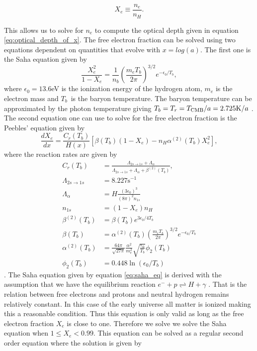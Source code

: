 \documentclass[onecolumn]{aastex62}
\begin{document}
\begin{equation}\label{eq:Xe}
    X_e\equiv\frac{n_e}{n_H}.
\end{equation}
 
This allows us to solve for $n_e$ to compute the optical depth given in equation \ref{eq:optical_depth_of_x}. The free electron fraction can be solved using two equations dependent on quantities that evolve with $x=log(a)$. The first one is the Saha equation given by
\begin{equation}\label{eq:saha_eq}
    \frac{X_e^2}{1-X_e} = \frac{1}{n_b} \left(\frac{m_eT_b}{2\pi}\right)^{3/2} e^{-\epsilon_0/T_b},
\end{equation}
where $\epsilon_0=13.6$eV is the ionization energy of the hydrogen atom, $m_e$ is the electron mass and $T_b$ is the baryon temperature. The baryon temperature can be approximated by the photon temperature giving $T_b =
T_r = T_{\rm CMB} / a = 2.725 \textrm{K} / a$ \cite{WintherII:2020}. The second equation one can use to solve for the free electron fraction is the Peebles' equation given by
\begin{equation}\label{eq:peeble_eq}
    \frac{dX_e}{dx} = \frac{C_r(T_b)}{H(x)} \left[\beta(T_b)(1-X_e) - n_H\alpha^{(2)}(T_b)X_e^2\right],
\end{equation}
where the reaction rates are given by
\begin{align}
    C_r(T_b) &= \frac{\Lambda_{2s\rightarrow1s} +
    \Lambda_{\alpha}}{\Lambda_{2s\rightarrow1s} + \Lambda_{\alpha} +
    \beta^{(2)}(T_b)}, \\
    \Lambda_{2s\rightarrow1s} &= 8.227 \textrm{s}^{-1}\\
    \Lambda_{\alpha} &= H\frac{(3\epsilon_0)^3}{(8\pi)^2 n_{1s}}\\
    n_{1s} &= (1-X_e)n_H \\
    \beta^{(2)}(T_b) &= \beta(T_b) e^{3\epsilon_0/4T_b} \\
    \beta(T_b) &= \alpha^{(2)}(T_b) \left(\frac{m_e
    T_b}{2\pi}\right)^{3/2} e^{-\epsilon_0/T_b} \\
    \alpha^{(2)}(T_b) &= \frac{64\pi}{\sqrt{27\pi}}
    \frac{\alpha^2}{m_e^2}\sqrt{\frac{\epsilon_0}{T_b}}\phi_2(T_b) \\
    \phi_2(T_b) &= 0.448\ln(\epsilon_0/T_b)
\end{align}
\cite{WintherII:2020}. The Saha equation given by equation \ref{eq:saha_eq} is derived with the assumption that we have the equilibrium reaction $e^- +p\rightleftharpoons H+\gamma$ \cite[p.70]{Dodelson:1282338}. That is the relation between free electrons and protons and neutral hydrogen remains relatively constant. In this case of the early universe all matter is ionized making this a reasonable condition. Thus this equation is only valid as long as the free electron fraction $X_e$ is close to one. Therefore we solve we solve the Saha equation when $1\leq X_e<0.99$. This equation can be solved as a regular second order equation where the solution is given by
\end{document}
